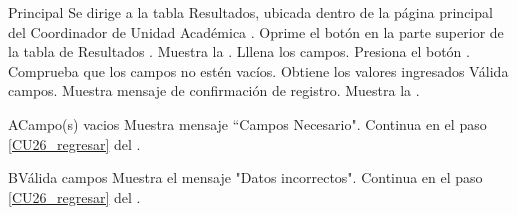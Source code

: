     \begin{UCtrayectoria}{Principal}
    \UCpaso[\UCactor] Se dirige a la tabla Resultados, ubicada dentro de la página principal del Coordinador de Unidad Académica .
    \UCpaso[\UCactor] Oprime el botón  en la parte superior de la tabla de Resultados .
    \UCpaso Muestra la . 
    \UCpaso[\UCactor] Lllena los campos. \label{CU26_regresar}  
    \UCpaso[\UCactor] Presiona el botón .
    \UCpaso Comprueba que los campos no estén vacíos. 
    \UCpaso Obtiene los valores ingresados
    \UCpaso Válida campos. 
    \UCpaso Muestra mensaje de confirmación de registro.
    \UCpaso Muestra la .
\end{UCtrayectoria}

\begin{UCtrayectoriaA}{A}{Campo(s) vacios}
	\UCpaso Muestra mensaje “Campos Necesario".
	\UCpaso Continua en el paso \ref{CU26_regresar} del .
\end{UCtrayectoriaA}

\begin{UCtrayectoriaA}{B}{Válida campos}
	\UCpaso Muestra el mensaje "Datos incorrectos".
	\UCpaso Continua en el paso \ref{CU26_regresar} del .
\end{UCtrayectoriaA}


	


